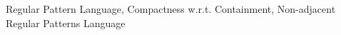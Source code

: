 \begin{keywords}
  Regular Pattern Language, Compactness w.r.t. Containment, Non-adjacent Regular Patterns Language
%
\end{keywords}
